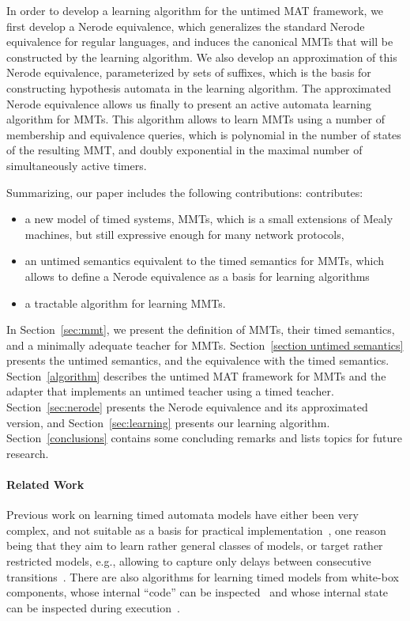 In order to develop a learning algorithm for the untimed MAT framework, we first develop
a Nerode equivalence, which generalizes the standard Nerode equivalence for
regular languages, and induces the canonical MMTs that will be constructed by the learning algorithm. 
We also develop an approximation of this Nerode equivalence,
parameterized by sets of suffixes, which is the basis for constructing
hypothesis automata in the learning algorithm. The approximated Nerode
equivalence allows us finally to present an active automata learning
algorithm for MMTs. This algorithm allows to learn MMTs using a number
of membership and equivalence queries, which is polynomial in the number of
states of the resulting MMT, and doubly exponential in the maximal number of
simultaneously active timers.

Summarizing, our paper 
\iflong
includes the following contributions:
\else
contributes:
\fi
\begin{itemize}
\item
  a new model of timed systems, MMTs, which is a small extensions of Mealy machines, but still expressive enough for many network protocols,
  \item
    an untimed semantics equivalent to the timed semantics for MMTs, which allows
    to define a Nerode equivalence as a basis for learning algorithms
   \item
     a tractable algorithm for learning MMTs.
\end{itemize}

In Section~\ref{sec:mmt}, we present the definition of MMTs, their timed semantics, and a minimally adequate teacher for MMTs.
Section~\ref{section untimed semantics} presents the untimed semantics, and the
equivalence with the timed semantics.
Section~\ref{algorithm} describes the untimed MAT framework for MMTs and the adapter that implements an untimed teacher using a timed teacher.
Section~\ref{sec:nerode} presents the Nerode equivalence and its approximated
version, and
Section~\ref{sec:learning} presents our learning algorithm.
Section~\ref{conclusions} contains some concluding remarks and lists topics for future research.
\ifshort
\fi

\paragraph{Related Work}
Previous work on learning timed automata models have either been very complex, and not suitable as a basis for
practical implementation~\cite{GrinchteinJP06,GrinchteinJL10}, one reason being that they aim to learn rather
general classes of models, or target rather restricted models, e.g., allowing to capture only
delays between consecutive transitions~\cite{VWW:rti,VWW:ic11}. 
There are also algorithms for learning timed models from white-box components,
whose internal ``code'' can be inspected~\cite{lin2014learning} and whose
internal state can be inspected during execution~\cite{maier2014online}.

